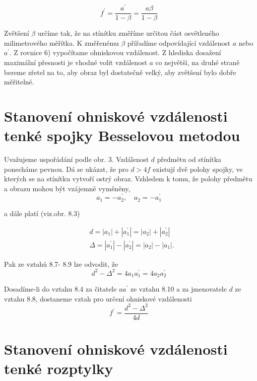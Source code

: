 \documentclass[czech,11pt,a4paper]{article}
\begin{document}
\begin{multicols}{2}
\begin{equation}
	f^{\prime}=\frac{a^{\prime}}{1-\beta}=\frac{a \beta}{1-\beta}
\end{equation}


Zvětšení $\beta$ určíme tak, že na stínítku změříme určitou část osvětleného milimetrového měřítka. K změřenému $\beta$ přířadíme odpovídající vzdálenost $a$ nebo $a^{\prime}$. Z rovnice 6) vypočítame ohniskovou vzdálenost. Z hlediska dosažení maximální přesnosti je vhodné volit vzdálenost $a$ co největší, na druhé straně bereme zřetel na to, aby obraz byl dostatečně velký, aby zvětšení bylo dobře měřitelné.

\section*{Stanovení ohniskové vzdálenosti tenké spojky Besselovou metodou}

Uvažujeme uspořádání podle obr. 3. Vzdálenost $d$ předmětu od stínítka ponecháme pevnou. Dá se ukázat, že pro $d>4 f$ existují dvě polohy spojky, ve kterých se na stínítku vytvoří ostrý obraz. Vzhledem k tomu, že polohy předmětu a obrazu mohou být vzájemně vyměněny,
\begin{equation}
	a_{1}=-a_{2}^{\prime}, \quad a_{2}=-a_{1}^{\prime}
\end{equation}

a dále platí (viz.obr. 8.3)

\begin{align}
	& d=\left|a_{1}\right|+\left|a_{1}^{\prime}\right|=\left|a_{2}\right|+\left|a_{2}^{\prime}\right| \\
	& \Delta=\left|a_{1}^{\prime}\right|-\left|a_{2}^{\prime}\right|=\left|a_{2}\right|-\left|a_{1}\right| .
\end{align}


Pak ze vztahů 8.7- 8.9 lze odvodit, že
\begin{equation}
	d^{2}-\Delta^{2}=4 a_{1} a_{1}^{\prime}=4 a_{2} a_{2}^{\prime}
\end{equation}


Dosadíme-li do vztahu 8.4 za čitatele $a a^{\prime}$ ze vztahu 8.10 a za jmenovatele $d$ ze vztahu 8.8, dostaneme vztah pro určení ohniskové vzdálenosti
\begin{equation}
	f^{\prime}=\frac{d^{2}-\Delta^{2}}{4 d}
\end{equation}


\section*{Stanovení ohniskové vzdálenosti tenké rozptylky}


\end{multicols}
\end{document}
